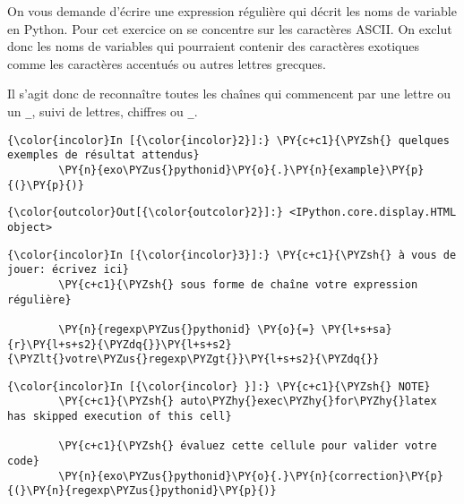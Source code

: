     On vous demande d'écrire une expression régulière qui décrit les noms de
variable en Python. Pour cet exercice on se concentre sur les caractères
ASCII. On exclut donc les noms de variables qui pourraient contenir des
caractères exotiques comme les caractères accentués ou autres lettres
grecques.

Il s'agit donc de reconnaître toutes les chaînes qui commencent par une
lettre ou un \texttt{\_}, suivi de lettres, chiffres ou \texttt{\_}.

    \begin{Verbatim}[commandchars=\\\{\},frame=single,framerule=0.3mm,rulecolor=\color{cellframecolor}]
{\color{incolor}In [{\color{incolor}2}]:} \PY{c+c1}{\PYZsh{} quelques exemples de résultat attendus}
        \PY{n}{exo\PYZus{}pythonid}\PY{o}{.}\PY{n}{example}\PY{p}{(}\PY{p}{)}
\end{Verbatim}


\begin{Verbatim}[commandchars=\\\{\},frame=single,framerule=0.3mm,rulecolor=\color{cellframecolor}]
{\color{outcolor}Out[{\color{outcolor}2}]:} <IPython.core.display.HTML object>
\end{Verbatim}
            
    \begin{Verbatim}[commandchars=\\\{\},frame=single,framerule=0.3mm,rulecolor=\color{cellframecolor}]
{\color{incolor}In [{\color{incolor}3}]:} \PY{c+c1}{\PYZsh{} à vous de jouer: écrivez ici}
        \PY{c+c1}{\PYZsh{} sous forme de chaîne votre expression régulière}
        
        \PY{n}{regexp\PYZus{}pythonid} \PY{o}{=} \PY{l+s+sa}{r}\PY{l+s+s2}{\PYZdq{}}\PY{l+s+s2}{\PYZlt{}votre\PYZus{}regexp\PYZgt{}}\PY{l+s+s2}{\PYZdq{}}
\end{Verbatim}


    \begin{Verbatim}[commandchars=\\\{\},frame=single,framerule=0.3mm,rulecolor=\color{cellframecolor}]
{\color{incolor}In [{\color{incolor} }]:} \PY{c+c1}{\PYZsh{} NOTE}
        \PY{c+c1}{\PYZsh{} auto\PYZhy{}exec\PYZhy{}for\PYZhy{}latex has skipped execution of this cell}
        
        \PY{c+c1}{\PYZsh{} évaluez cette cellule pour valider votre code}
        \PY{n}{exo\PYZus{}pythonid}\PY{o}{.}\PY{n}{correction}\PY{p}{(}\PY{n}{regexp\PYZus{}pythonid}\PY{p}{)}
\end{Verbatim}


